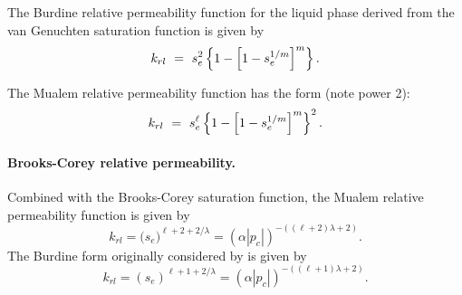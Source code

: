 The Burdine relative permeability function for the liquid phase derived
from the van Genuchten saturation function is given by
\begin{equation}
  k_{rl} \ =\  s_e^{2} \left\{ 1 - \left[ 1 - s_e^{1/m} \right]^m \right\}.
  \label{eq:krl_vGB} 
\end{equation}

The Mualem 
relative permeability function has the form (note power 2):
\begin{equation}
  k_{rl} \ =\  s_e^{\ell} \left\{ 1 - \left[ 1 - s_e^{1/m} \right]^m \right\}^2.
  \label{eq:krl_vGM} 
\end{equation}




\paragraph{Brooks-Corey relative permeability.}
Combined with the Brooks-Corey saturation function, the Mualem
relative permeability function is given by
\begin{equation} \label{eq:krl_BCM}
  k_{rl} = \big(s_e\big)^{\ell+2+2/\lambda} 
         = \left(\alpha |p_c|\right)^{-((\ell+2)\lambda+2)}.
\end{equation}
The Burdine form originally considered by \citet{brooks1964hydraulic}
is given by
\begin{equation} \label{eq:krl_BCB}
  k_{rl} = \left( s_e \right)^{ \ell+1+2/\lambda}
         = \left( \alpha |p_c| \right)^{-((\ell+1)\lambda+2)}.
\end{equation}







